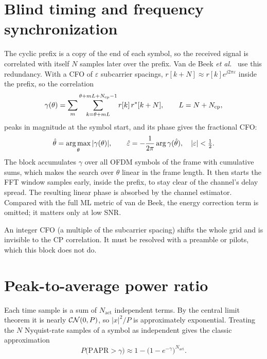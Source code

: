 \section{Blind timing and frequency synchronization}\label{sec:ofdm-sync}
The cyclic prefix is a copy of the end of each symbol, so the received signal is correlated
with itself $N$ samples later over the prefix. Van de Beek \emph{et al.}~\cite{vandebeek1997}
use this redundancy. With a CFO of $\varepsilon$ subcarrier spacings, $r[k+N]\approx r[k]e^{j2\pi\varepsilon}$
inside the prefix, so the correlation
\begin{equation}
  \gamma(\theta)=\sum_{m}\sum_{k=\theta+mL}^{\theta+mL+N_{\mathrm{cp}}-1}r[k]\,r^{*}[k+N],\qquad L=N+N_{\mathrm{cp}},
\end{equation}
peaks in magnitude at the symbol start, and its phase gives the fractional CFO:
\begin{equation}
  \hat\theta=\operatorname*{arg\,max}_\theta|\gamma(\theta)|,\qquad \hat\varepsilon=-\frac{1}{2\pi}\arg\gamma(\hat\theta),\quad|\varepsilon|<\tfrac12 .
\end{equation}
The block accumulates $\gamma$ over all OFDM symbols of the frame with cumulative sums, which
makes the search over $\theta$ linear in the frame length. It then starts the FFT window
 samples early, inside the prefix, to stay clear of the channel's delay spread.
The resulting linear phase is absorbed by the channel estimator. Compared with the full ML
metric of van de Beek, the energy correction term is omitted; it matters only at low SNR.

\begin{pitfall}
An integer CFO (a multiple of the subcarrier spacing) shifts the whole grid and is
invisible to the CP correlation. It must be resolved with a preamble or pilots, which this
block does not do.
\end{pitfall}

\section{Peak-to-average power ratio}\label{sec:papr}
Each time sample is a sum of $N_{\mathrm{act}}$ independent terms. By the central limit theorem
it is nearly $\mathcal{CN}(0,P)$, so $|x|^2/P$ is approximately exponential. Treating the $N$ Nyquist-rate
samples of a symbol as independent gives the classic approximation
\begin{equation}
  P\big(\mathrm{PAPR}>\gamma\big)\approx1-\big(1-e^{-\gamma}\big)^{N_{\mathrm{act}}} .
\end{equation}

